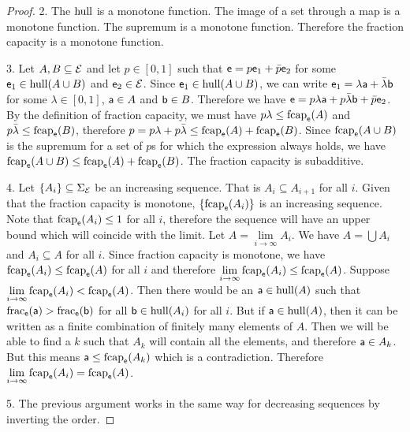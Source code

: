 \begin{mathSection}
\begin{proof}
		2. The $\hull$ is a monotone function. The image of a set through a map is a monotone function. The supremum is a monotone function. Therefore the fraction capacity is a monotone function.
		
		3. Let $A, B \subseteq \Ens$ and let $p \in [0,1]$ such that $\ens = p \ens_1 + \bar{p} \ens_2$ for some $\ens_1 \in \hull(A \cup B)$ and $\ens_2 \in \Ens$. Since $\ens_1 \in \hull(A \cup B)$, we can write $\ens_1 = \lambda \ens[a] + \bar{\lambda} \ens[b]$ for some $\lambda \in [0,1]$, $\ens[a] \in A$ and $\ens[b] \in B$. Therefore we have $\ens = p \lambda \ens[a] + p \bar{\lambda} \ens[b] + \bar{p} \ens_2$. By the definition of fraction capacity, we must have $p\lambda \leq \fcap_{\ens}(A)$ and $p\bar{\lambda} \leq \fcap_{\ens}(B)$, therefore $p = p\lambda + p\bar{\lambda} \leq \fcap_{\ens}(A) + \fcap_{\ens}(B)$. 	Since $\fcap_{\ens}(A \cup B)$ is the supremum for a set of $p$s for which the expression always holds, we have $\fcap_{\ens}(A \cup B) \leq \fcap_{\ens}(A) + \fcap_{\ens}(B)$. The fraction capacity is subadditive.
		
		4. Let $\{A_i\} \subseteq \Sigma_{\Ens}$ be an increasing sequence. That is $A_i \subseteq A_{i+1}$ for all $i$. Given that the fraction capacity is monotone, $\{\fcap_{\ens}(A_i)\}$ is an increasing sequence. Note that $\fcap_{\ens}(A_i) \leq 1$ for all $i$, therefore the sequence will have an upper bound which will coincide with the limit. Let $A = \lim\limits_{i \to \infty} A_i$. We have $A = \bigcup A_i$ and $A_i \subseteq A$ for all $i$. Since fraction capacity is monotone, we have $\fcap_{\ens}(A_i) \leq \fcap_{\ens}(A)$ for all $i$ and therefore $\lim\limits_{i \to \infty} \fcap_{\ens}(A_i) \leq \fcap_{\ens}(A)$. Suppose $\lim\limits_{i \to \infty} \fcap_{\ens}(A_i) < \fcap_{\ens}(A)$. Then there would be an $\ens[a] \in \hull(A)$ such that $\size_{\ens}(\ens[a]) > \size_{\ens}(\ens[b])$ for all $\ens[b] \in \hull(A_i)$ for all $i$. But if $\ens[a] \in \hull(A)$, then it can be written as a finite combination of finitely many elements of $A$. Then we will be able to find a $k$ such that $A_k$ will contain all the elements, and therefore $\ens[a] \in A_k$. But this means $\ens[a] \leq \fcap_{\ens}(A_k)$ which is a contradiction. Therefore $\lim\limits_{i \to \infty} \fcap_{\ens}(A_i) = \fcap_{\ens}(A)$.
		
		5. The previous argument works in the same way for decreasing sequences by inverting the order.
	\end{proof}
\end{mathSection}

